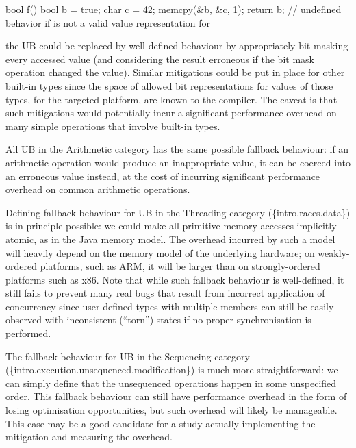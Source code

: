 \begin{codeblock}
bool f() {
  bool b = true;
  char c = 42;
  memcpy(&b, &c, 1);
  return b;         // undefined behavior if  is not a valid value representation for 
}
\end{codeblock}

the UB could be replaced by well-defined behaviour by appropriately bit-masking every accessed  value (and considering the result erroneous if the bit mask operation changed the value). Similar mitigations could be put in place for other built-in types since the space of allowed bit representations for values of those types, for the targeted platform, are known to the compiler. The caveat is that such mitigations would potentially incur a significant performance overhead on many simple operations that involve built-in types.

All UB in the Arithmetic category has the same possible fallback behaviour: if an arithmetic operation would produce an inappropriate value, it can be coerced into an erroneous value instead, at the cost of incurring significant performance overhead on common arithmetic operations.

Defining fallback behaviour for UB in the Threading category (\{intro.races.data\}) is in principle possible: we could make all primitive memory accesses implicitly atomic, as in the Java memory model. The overhead incurred by such a model will heavily depend on the memory model of the underlying hardware; on weakly-ordered platforms, such as ARM,
it will be larger than on strongly-ordered platforms such as x86. Note that while such fallback behaviour is well-defined, it still fails to prevent many real bugs that result from incorrect application of concurrency since user-defined types with multiple members can still be easily observed with inconsistent (``torn'') states if no proper synchronisation is performed.

The fallback behaviour for UB in the Sequencing category (\{intro.execution.unsequenced.modifica\-tion\})
is much more straightforward: we can simply define that the unsequenced operations happen in some unspecified order. This fallback behaviour can still have performance overhead in the form of losing  optimisation opportunities, but such overhead will likely be manageable. This case may be a good candidate for a study actually implementing the mitigation and measuring the overhead. %

